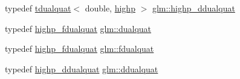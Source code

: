 \begin{DoxyCompactItemize}
\item 
typedef \mbox{\hyperlink{structglm_1_1tdualquat}{tdualquat}}$<$ double, \mbox{\hyperlink{namespaceglm_a36ed105b07c7746804d7fdc7cc90ff25ac6f7eab42eacbb10d59a58e95e362074}{highp}} $>$ \mbox{\hyperlink{group__gtx__dual__quaternion_ga83e4c5d27c8b0a264a3f3aed24f3f84e}{glm\+::highp\+\_\+ddualquat}}
\item 
typedef \mbox{\hyperlink{group__gtx__dual__quaternion_ga8c46d61c38b2b6d9c5091c667dd20fe8}{highp\+\_\+fdualquat}} \mbox{\hyperlink{group__gtx__dual__quaternion_ga2f6227b5f9dc08a2e7682065a84b3aa9}{glm\+::dualquat}}
\item 
typedef \mbox{\hyperlink{group__gtx__dual__quaternion_ga8c46d61c38b2b6d9c5091c667dd20fe8}{highp\+\_\+fdualquat}} \mbox{\hyperlink{group__gtx__dual__quaternion_ga436906129bc69ca5059555cafcbac9fd}{glm\+::fdualquat}}
\item 
typedef \mbox{\hyperlink{group__gtx__dual__quaternion_ga83e4c5d27c8b0a264a3f3aed24f3f84e}{highp\+\_\+ddualquat}} \mbox{\hyperlink{group__gtx__dual__quaternion_ga373431ffdd82d5c03c258217a9e1f1a6}{glm\+::ddualquat}}
\end{DoxyCompactItemize}

